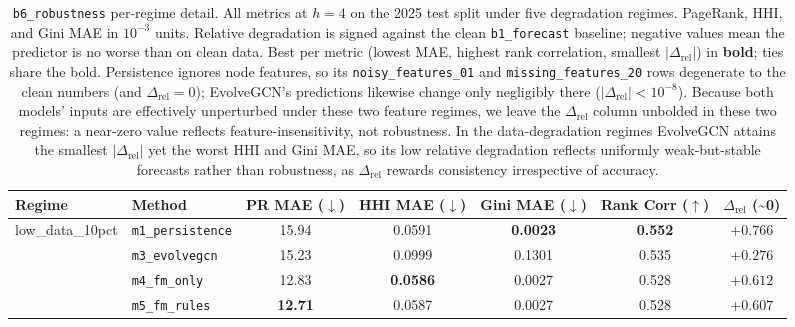 \begin{table}[!htbp]
\centering
\footnotesize
\setlength{\tabcolsep}{4pt}
\caption{\texttt{b6\_robustness} per-regime detail. All metrics at $h{=}4$
on the 2025 test split under five degradation regimes. PageRank, HHI, and
Gini MAE in $10^{-3}$ units. Relative degradation is signed against the
clean \texttt{b1\_forecast} baseline; negative values mean the predictor is
no worse than on clean data. Best per metric (lowest MAE, highest rank
correlation, smallest $|\Delta_{\mathrm{rel}}|$) in \textbf{bold};
ties share the bold.
Persistence ignores node features, so its \texttt{noisy\_features\_01} and
\texttt{missing\_features\_20} rows degenerate to the clean numbers (and
$\Delta_{\mathrm{rel}}=0$); EvolveGCN's predictions likewise change only
negligibly there ($|\Delta_{\mathrm{rel}}|<10^{-8}$). Because both models'
inputs are effectively unperturbed under these two feature regimes, we leave
the $\Delta_{\mathrm{rel}}$ column unbolded in these two regimes: a near-zero value
reflects feature-insensitivity, not robustness. In the data-degradation
regimes EvolveGCN attains the smallest $|\Delta_{\mathrm{rel}}|$ yet the worst
HHI and Gini MAE, so its low relative degradation reflects uniformly
weak-but-stable forecasts rather than robustness, as $\Delta_{\mathrm{rel}}$
rewards consistency irrespective of accuracy.}
\label{tab:b6_detail}
\begin{tabular}{l l c c c c c}
\toprule
Regime & Method & PR MAE ($\downarrow$) & HHI MAE ($\downarrow$) & Gini MAE ($\downarrow$) & Rank Corr ($\uparrow$) & $\Delta_{\mathrm{rel}}$ (\textasciitilde 0) \\
\midrule
\multirow{4}{*}{low\_data\_10pct}
& \texttt{m1\_persistence} & 15.94          & 0.0591          & \textbf{0.0023} & \textbf{0.552} & $+0.766$ \\
& \texttt{m3\_evolvegcn}   & 15.23          & 0.0999          & 0.1301          & 0.535          & $\mathbf{+0.276}$ \\
& \texttt{m4\_fm\_only}    & 12.83          & \textbf{0.0586} & 0.0027          & 0.528          & $+0.612$ \\
& \texttt{m5\_fm\_rules}   & \textbf{12.71} & 0.0587          & 0.0027          & 0.528          & $+0.607$ \\

\end{tabular}
\end{table}
